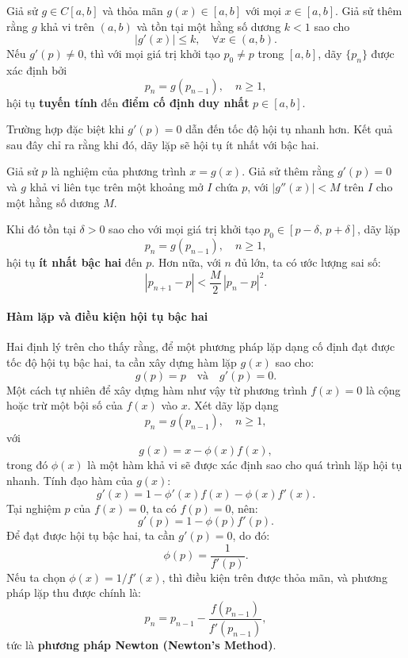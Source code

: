 \begin{theorem}
Giả sử $g \in C[a, b]$ và thỏa mãn $g(x) \in [a, b]$ với mọi $x \in [a, b]$. 
Giả sử thêm rằng $g$ khả vi trên $(a, b)$ và tồn tại một hằng số dương $k < 1$ sao cho
\[
    |g'(x)| \le k, \quad \forall x \in (a, b).
\]
Nếu $g'(p) \ne 0$, thì với mọi giá trị khởi tạo $p_0 \ne p$ trong $[a, b]$, 
dãy $\{p_n\}$ được xác định bởi
\[
    p_n = g(p_{n-1}), \quad n \ge 1,
\]
hội tụ \textbf{tuyến tính} đến \textbf{điểm cố định duy nhất} $p \in [a, b]$.
\end{theorem}

Trường hợp đặc biệt khi $g'(p) = 0$ dẫn đến tốc độ hội tụ nhanh hơn. 
Kết quả sau đây chỉ ra rằng khi đó, dãy lặp sẽ hội tụ ít nhất với bậc hai.

\begin{theorem}
Giả sử $p$ là nghiệm của phương trình $x = g(x)$. 
Giả sử thêm rằng $g'(p) = 0$ và $g$ khả vi liên tục trên một khoảng mở $I$ chứa $p$, với $|g''(x)| < M$ trên $I$ cho một hằng số dương $M$.

Khi đó tồn tại $\delta > 0$ sao cho với mọi giá trị khởi tạo 
$p_0 \in [p - \delta,\, p + \delta]$, dãy lặp
\[
    p_n = g(p_{n-1}), \quad n \ge 1,
\]
hội tụ \textbf{ít nhất bậc hai} đến $p$. Hơn nữa, với $n$ đủ lớn, ta có ước lượng sai số:
\[
    |p_{n+1} - p| < \frac{M}{2}\, |p_n - p|^2.
\]
\end{theorem}

\paragraph*{Hàm lặp và điều kiện hội tụ bậc hai}
Hai định lý trên cho thấy rằng, để một phương pháp lặp dạng cố định đạt được tốc độ hội tụ bậc hai, 
ta cần xây dựng hàm lặp $g(x)$ sao cho:
\[
    g(p) = p \quad \text{và} \quad g'(p) = 0.
\]
Một cách tự nhiên để xây dựng hàm như vậy từ phương trình $f(x) = 0$
là cộng hoặc trừ một bội số của $f(x)$ vào $x$. 
Xét dãy lặp dạng
\[
    p_n = g(p_{n-1}), \quad n \ge 1,
\]
với
\[
    g(x) = x - \phi(x) f(x),
\]
trong đó $\phi(x)$ là một hàm khả vi sẽ được xác định sao cho quá trình lặp hội tụ nhanh.
Tính đạo hàm của $g(x)$:
\[
    g'(x) = 1 - \phi'(x)f(x) - \phi(x)f'(x).
\]
Tại nghiệm $p$ của $f(x) = 0$, ta có $f(p) = 0$, nên:
\[
    g'(p) = 1 - \phi(p)f'(p).
\]
Để đạt được hội tụ bậc hai, ta cần $g'(p) = 0$, do đó:
\[
    \phi(p) = \frac{1}{f'(p)}.
\]
Nếu ta chọn $\phi(x) = 1 / f'(x)$, thì điều kiện trên được thỏa mãn, và phương pháp lặp thu được chính là:
\[
    p_n = p_{n-1} - \frac{f(p_{n-1})}{f'(p_{n-1})},
\]
tức là \textbf{phương pháp Newton (Newton's Method)}.\\

